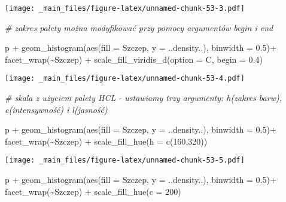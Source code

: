 \documentclass[
]{book}
\newenvironment{Shaded}{\begin{snugshade}}{\end{snugshade}}
\newcommand{\AttributeTok}[1]{\textcolor[rgb]{0.77,0.63,0.00}{#1}}
\newcommand{\CommentTok}[1]{\textcolor[rgb]{0.56,0.35,0.01}{\textit{#1}}}
\newcommand{\DecValTok}[1]{\textcolor[rgb]{0.00,0.00,0.81}{#1}}
\newcommand{\FloatTok}[1]{\textcolor[rgb]{0.00,0.00,0.81}{#1}}
\newcommand{\FunctionTok}[1]{\textcolor[rgb]{0.00,0.00,0.00}{#1}}
\newcommand{\NormalTok}[1]{#1}
\newcommand{\SpecialCharTok}[1]{\textcolor[rgb]{0.00,0.00,0.00}{#1}}
\newcommand{\StringTok}[1]{\textcolor[rgb]{0.31,0.60,0.02}{#1}}
\begin{document}
\texttt{[image: \_main\_files/figure-latex/unnamed-chunk-53-3.pdf]}

\begin{Shaded}
\begin{Highlighting}[]
\CommentTok{\# zakres palety można modyfikować przy pomocy argumentów begin i end}

\NormalTok{p }\SpecialCharTok{+} \FunctionTok{geom\_histogram}\NormalTok{(}\FunctionTok{aes}\NormalTok{(}\AttributeTok{fill =}\NormalTok{ Szczep, }\AttributeTok{y =}\NormalTok{ ..density..), }\AttributeTok{binwidth =} \FloatTok{0.5}\NormalTok{)}\SpecialCharTok{+}
  \FunctionTok{facet\_wrap}\NormalTok{(}\SpecialCharTok{\textasciitilde{}}\NormalTok{Szczep) }\SpecialCharTok{+} \FunctionTok{scale\_fill\_viridis\_d}\NormalTok{(}\AttributeTok{option =} \StringTok{\textquotesingle{}C\textquotesingle{}}\NormalTok{, }\AttributeTok{begin =} \FloatTok{0.4}\NormalTok{)}
\end{Highlighting}
\end{Shaded}

\texttt{[image: \_main\_files/figure-latex/unnamed-chunk-53-4.pdf]}

\begin{Shaded}
\begin{Highlighting}[]
\CommentTok{\# skala z użyciem palety HCL {-} ustawiamy trzy argumenty: h(zakres barw), c(intensywność) i l(jasność)}

\NormalTok{p }\SpecialCharTok{+} \FunctionTok{geom\_histogram}\NormalTok{(}\FunctionTok{aes}\NormalTok{(}\AttributeTok{fill =}\NormalTok{ Szczep, }\AttributeTok{y =}\NormalTok{ ..density..), }\AttributeTok{binwidth =} \FloatTok{0.5}\NormalTok{)}\SpecialCharTok{+}
  \FunctionTok{facet\_wrap}\NormalTok{(}\SpecialCharTok{\textasciitilde{}}\NormalTok{Szczep) }\SpecialCharTok{+} \FunctionTok{scale\_fill\_hue}\NormalTok{(}\AttributeTok{h =} \FunctionTok{c}\NormalTok{(}\DecValTok{160}\NormalTok{,}\DecValTok{320}\NormalTok{))}
\end{Highlighting}
\end{Shaded}

\texttt{[image: \_main\_files/figure-latex/unnamed-chunk-53-5.pdf]}

\begin{Shaded}
\begin{Highlighting}[]
\NormalTok{p }\SpecialCharTok{+} \FunctionTok{geom\_histogram}\NormalTok{(}\FunctionTok{aes}\NormalTok{(}\AttributeTok{fill =}\NormalTok{ Szczep, }\AttributeTok{y =}\NormalTok{ ..density..), }\AttributeTok{binwidth =} \FloatTok{0.5}\NormalTok{)}\SpecialCharTok{+}
  \FunctionTok{facet\_wrap}\NormalTok{(}\SpecialCharTok{\textasciitilde{}}\NormalTok{Szczep) }\SpecialCharTok{+} \FunctionTok{scale\_fill\_hue}\NormalTok{(}\AttributeTok{c =} \DecValTok{200}\NormalTok{)}
\end{Highlighting}
\end{Shaded}
\end{document}
